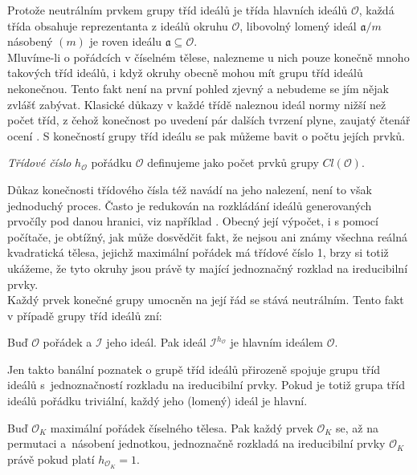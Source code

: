 \documentclass [12pt]{report}
\begin{document}
Protože neutrálním prvkem grupy tříd ideálů je třída hlavních ideálů $\mathcal{O}$, každá třída obsahuje reprezentanta z ideálů okruhu $\mathcal{O}$, libovolný lomený ideál $\mathfrak{a}/m$ násobený $(m)$ je roven ideálu $\mathfrak{a} \subseteq \mathcal{O}$.\\

Mluvíme-li o pořádcích v číselném tělese, nalezneme u nich pouze konečně mnoho takových tříd ideálů, i když okruhy obecně mohou mít grupu tříd ideálů nekonečnou. Tento fakt není na první pohled zjevný a nebudeme se jím nějak zvlášť zabývat. Klasické důkazy v každé třídě naleznou ideál normy nižší než počet tříd, z čehož konečnost po uvedení pár dalších tvrzení plyne, zaujatý čtenář ocení \cite[Kap. 5]{Pupik}. S konečností grupy tříd ideálu se pak můžeme bavit o počtu jejích prvků.

\begin{definice}
\textit{Třídové číslo} $h_{\mathcal{O}}$ pořádku $\mathcal{O}$ definujeme jako počet prvků grupy $Cl(\mathcal{O})$.
\end{definice}

Důkaz konečnosti třídového čísla též navádí na jeho nalezení, není to však jednoduchý proces. Často je redukován na rozkládání ideálů generovaných prvočíly pod danou hranici, viz například \cite[Kap. 5.]{Pupik}. Obecný její výpočet, i s pomocí počítače, je obtížný, jak může dosvědčit fakt, že nejsou ani známy všechna reálná kvadratická tělesa, jejichž maximální pořádek má třídové číslo 1, brzy si totiž ukážeme, že tyto okruhy jsou právě ty mající jednoznačný rozklad na ireducibilní prvky.\\ 

Každý prvek konečné grupy umocněn na její řád se stává neutrálním. Tento fakt v případě grupy tříd ideálů zní:
\begin{veta}
Buď $\mathcal{O}$ pořádek a $\mathcal{I}$ jeho ideál. Pak ideál $\mathcal{I}^{h_{\mathcal{O}}}$ je hlavním ideálem $\mathcal{O}$.
\end{veta}

Jen takto banální poznatek o grupě tříd ideálů přirozeně spojuje grupu tříd ideálů s~jednoznačností rozkladu na ireducibilní prvky. Pokud je totiž grupa tříd ideálů pořádku triviální, každý jeho (lomený) ideál je hlavní.

\begin{veta}
Buď $\mathcal{O}_K$ maximální pořádek číselného tělesa. Pak každý prvek $\mathcal{O}_K$ se, až na permutaci a~násobení jednotkou, jednoznačně rozkladá na ireducibilní prvky $\mathcal{O}_K$ právě pokud platí $h_{\mathcal{O}_K} = 1$.
\end{veta}
\end{document}
